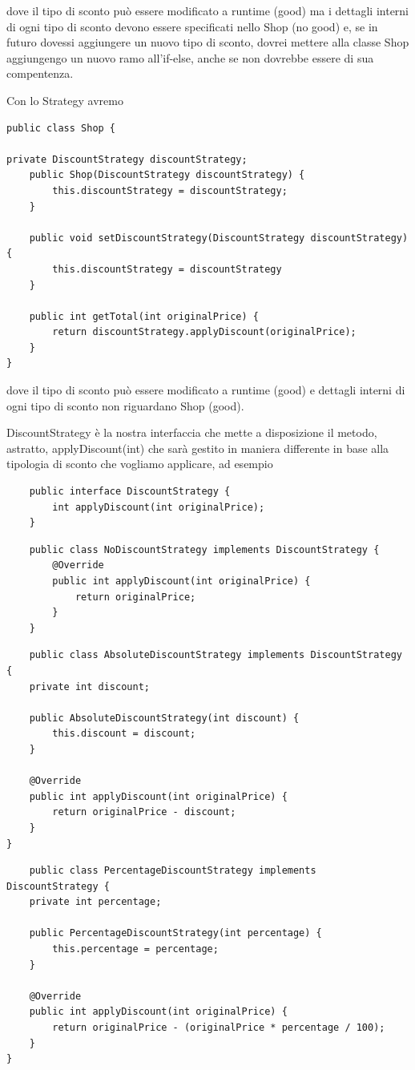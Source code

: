 dove il tipo di sconto può essere modificato a runtime (good) ma i dettagli interni di ogni tipo di sconto devono essere specificati nello Shop (no good) e, se 
in futuro dovessi aggiungere un nuovo tipo di sconto, dovrei mettere alla classe Shop aggiungengo un nuovo ramo all'if-else, anche se non dovrebbe essere di sua 
compentenza.

Con lo Strategy avremo 
\begin{lstlisting}
public class Shop {

private DiscountStrategy discountStrategy;
    public Shop(DiscountStrategy discountStrategy) {
        this.discountStrategy = discountStrategy;
    }

    public void setDiscountStrategy(DiscountStrategy discountStrategy) {
        this.discountStrategy = discountStrategy
    }

    public int getTotal(int originalPrice) {
        return discountStrategy.applyDiscount(originalPrice);
    }
}
\end{lstlisting}

dove il tipo di sconto può essere modificato a runtime (good) e dettagli interni di ogni tipo di sconto non riguardano Shop (good).

DiscountStrategy è la nostra interfaccia che mette a disposizione il metodo, astratto, applyDiscount(int) che sarà gestito in maniera differente in base alla tipologia
di sconto che vogliamo applicare, ad esempio
\begin{multicols}{2}
\begin{lstlisting}
    public interface DiscountStrategy {
        int applyDiscount(int originalPrice);
    }
\end{lstlisting}
\columnbreak
\begin{lstlisting}
    public class NoDiscountStrategy implements DiscountStrategy {
        @Override
        public int applyDiscount(int originalPrice) {
            return originalPrice;
        }
    }
\end{lstlisting}
\end{multicols}

\begin{multicols}{2}
\begin{lstlisting}
    public class AbsoluteDiscountStrategy implements DiscountStrategy {
    private int discount;
    
    public AbsoluteDiscountStrategy(int discount) {
        this.discount = discount;
    }

    @Override
    public int applyDiscount(int originalPrice) {
        return originalPrice - discount;
    }
}    
\end{lstlisting}
\columnbreak
\begin{lstlisting}
    public class PercentageDiscountStrategy implements DiscountStrategy {
    private int percentage;
    
    public PercentageDiscountStrategy(int percentage) {
        this.percentage = percentage;
    }

    @Override
    public int applyDiscount(int originalPrice) {
        return originalPrice - (originalPrice * percentage / 100);
    }
}
\end{lstlisting}
\end{multicols}

